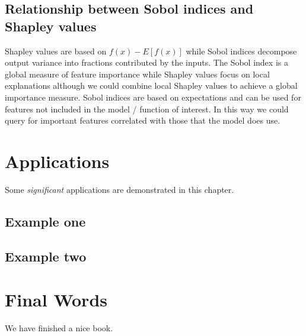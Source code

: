 \documentclass[
]{book}
\begin{document}
\hypertarget{relationship-between-sobol-indices-and-shapley-values}{%
\section{Relationship between Sobol indices and Shapley values}\label{relationship-between-sobol-indices-and-shapley-values}}

Shapley values are based on \(f(x)-E[f(x)]\) while Sobol indices decompose output variance into fractions contributed by the inputs. The Sobol index is a global measure of feature importance while Shapley values focus on local explanations although we could combine local Shapley values to achieve a global importance measure. Sobol indices are based on expectations and can be used for features not included in the model / function of interest. In this way we could query for important features correlated with those that the model does use.

\hypertarget{applications}{%
\chapter{Applications}\label{applications}}

Some \emph{significant} applications are demonstrated in this chapter.

\hypertarget{example-one}{%
\section{Example one}\label{example-one}}

\hypertarget{example-two}{%
\section{Example two}\label{example-two}}

\hypertarget{final-words}{%
\chapter{Final Words}\label{final-words}}

We have finished a nice book.

  
\end{document}
